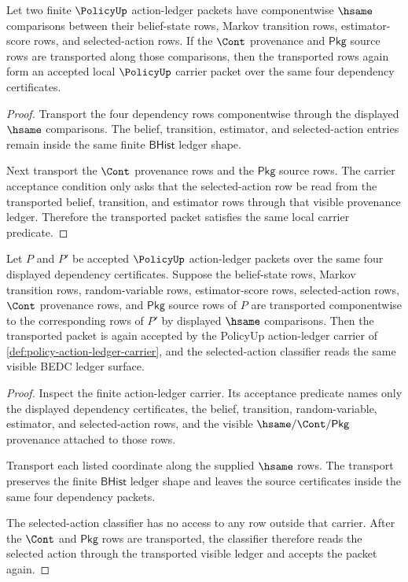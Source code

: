 \begin{theorem}
\label{thm:policy-local-action-transport}
Let two finite $\PolicyUp$ action-ledger packets have componentwise $\hsame$
comparisons between their belief-state rows, Markov transition rows,
estimator-score rows, and selected-action rows. If the $\Cont$ provenance and
$\mathsf{Pkg}$ source rows are transported along those comparisons, then the
transported rows again form an accepted local $\PolicyUp$ carrier packet over
the same four dependency certificates.
\end{theorem}
\begin{proof}
Transport the four dependency rows componentwise through the displayed
$\hsame$ comparisons. The belief, transition, estimator, and selected-action
entries remain inside the same finite $\mathsf{BHist}$ ledger shape.

Next transport the $\Cont$ provenance rows and the $\mathsf{Pkg}$ source rows.
The carrier acceptance condition only asks that the selected-action row be read
from the transported belief, transition, and estimator rows through that
visible provenance ledger. Therefore the transported packet satisfies the same
local carrier predicate.
\end{proof}

\begin{theorem}
\label{thm:policy-action-classifier-stability}
Let $P$ and $P'$ be accepted $\PolicyUp$ action-ledger packets over the same
four displayed dependency certificates. Suppose the belief-state rows, Markov
transition rows, random-variable rows, estimator-score rows, selected-action
rows, $\Cont$ provenance rows, and $\mathsf{Pkg}$ source rows of $P$ are
transported componentwise to the corresponding rows of $P'$ by displayed
$\hsame$ comparisons. Then the transported packet is again accepted by the
PolicyUp action-ledger carrier of
\autoref{def:policy-action-ledger-carrier}, and the selected-action
classifier reads the same visible BEDC ledger surface.
\end{theorem}
\begin{proof}
Inspect the finite action-ledger carrier. Its acceptance predicate names only
the displayed dependency certificates, the belief, transition,
random-variable, estimator, and selected-action rows, and the visible
$\hsame/\Cont/\mathsf{Pkg}$ provenance attached to those rows.

Transport each listed coordinate along the supplied $\hsame$ rows. The
transport preserves the finite $\mathsf{BHist}$ ledger shape and leaves the
source certificates inside the same four dependency packets.

The selected-action classifier has no access to any row outside that carrier.
After the $\Cont$ and $\mathsf{Pkg}$ rows are transported, the classifier
therefore reads the selected action through the transported visible ledger and
accepts the packet again.
\end{proof}

